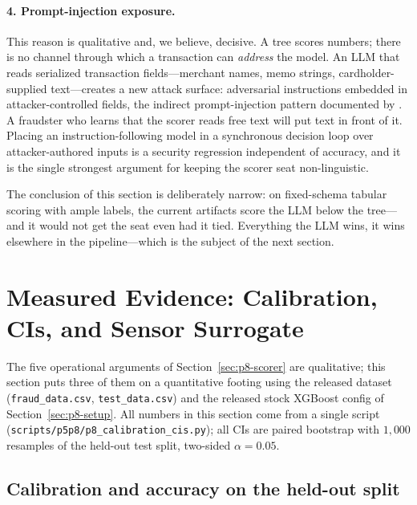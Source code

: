 \documentclass{article}
\providecommand{\secref}[1]{Section~\ref{#1}}
\begin{document}
\paragraph{4. Prompt-injection exposure.} This reason is qualitative and, we
believe, decisive. A tree scores numbers; there is no channel through which a
transaction can \emph{address} the model. An LLM that reads serialized
transaction fields---merchant names, memo strings, cardholder-supplied
text---creates a new attack surface: adversarial instructions embedded in
attacker-controlled fields, the indirect prompt-injection pattern documented
by \citet{greshake2023injection}. A fraudster who learns that the scorer reads
free text will put text in front of it. Placing an instruction-following model
in a synchronous decision loop over attacker-authored inputs is a security
regression independent of accuracy, and it is the single strongest argument
for keeping the scorer seat non-linguistic.

The conclusion of this section is deliberately narrow: on fixed-schema tabular
scoring with ample labels, the current artifacts score the LLM below the
tree---and it would not get the seat even had it tied. Everything the LLM wins, it wins elsewhere in the pipeline---which is the
subject of the next section.
 \section{Measured Evidence: Calibration, CIs, and Sensor Surrogate}
\label{sec:p8-evidence}

The five operational arguments of \secref{sec:p8-scorer} are
qualitative; this section puts three of them on a quantitative footing
using the released dataset (\texttt{fraud\_data.csv},
\texttt{test\_data.csv}) and the released stock XGBoost config of
\secref{sec:p8-setup}. All numbers in this section come from a single
script (\texttt{scripts/p5p8/p8\_calibration\_cis.py}); all CIs are
paired bootstrap with $1{,}000$ resamples of the held-out test split,
two-sided $\alpha{=}0.05$.

\subsection{Calibration and accuracy on the held-out split}
\end{document}
